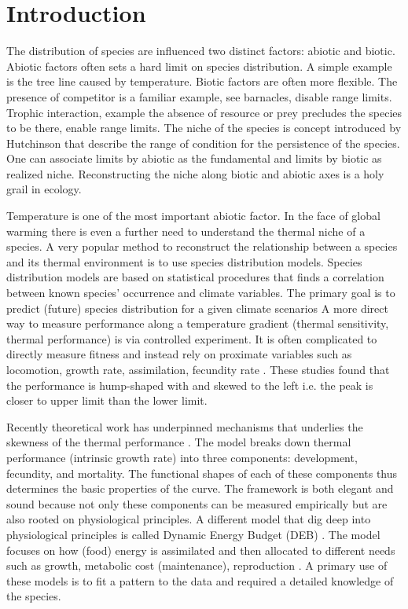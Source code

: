 \section*{Introduction}
The distribution of species are influenced two distinct factors: abiotic and biotic.
Abiotic factors often sets a hard limit on species distribution.
A simple example is the tree line caused by temperature.
Biotic factors are often more flexible.
The presence of competitor is a familiar example, see barnacles, disable range limits.
Trophic interaction, example the absence of resource or prey precludes the  species to be there, enable range limits.
The niche of the species is concept introduced by Hutchinson that describe the range of condition for the persistence of the species.
One can associate limits by abiotic as the fundamental and limits by biotic as realized niche.
Reconstructing the niche along biotic and abiotic axes is a holy grail in ecology. 

Temperature is one of the most important abiotic factor. %
In the face of global warming there is even a further need to understand the thermal niche of a species.
A very popular method to reconstruct the relationship between a species and its thermal environment is to use species distribution models. 
Species distribution models are based on statistical procedures that finds a correlation between known species' occurrence and climate variables.
The primary goal is to predict (future) species distribution for a given climate scenarios \citep{Guisan2005, Austin2007, Elith2009}
A more direct way to measure performance along a temperature gradient (thermal sensitivity, thermal performance) is via controlled experiment.
It is often complicated to directly measure fitness and instead rely on proximate variables such as locomotion, growth rate, assimilation, fecundity rate \citep[][and reference therein]{Angilletta2009}.
These studies found that the performance is hump-shaped with and skewed to the left i.e. the peak is closer to upper limit than the lower limit.

Recently theoretical work has underpinned mechanisms that underlies the skewness of the thermal performance \citep{Amarasekare2012}.
The model  breaks down thermal performance (intrinsic growth rate)  into three components: development, fecundity, and mortality.
The functional shapes of each of these components thus determines the basic properties of the curve.
The framework is both elegant and sound because not only these components can be measured empirically but are also rooted on physiological principles.
A different model that dig deep into physiological principles is called Dynamic Energy Budget (DEB) \citep{Kooijman2009}.
The model focuses on how (food) energy is assimilated and then allocated to different needs such as growth, metabolic cost (maintenance), reproduction \citep{Kooijman2009}.
A primary use of  these models is to fit a pattern to the data and required a detailed knowledge of the species.  


